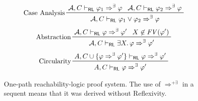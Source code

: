 \begin{figure}
    \begin{align*}
        & \prftree[l]{Case Analysis}
          { \mathcal{A}, C \vdash_\RL \varphi_1 \Rightarrow^{\exists} \varphi }
          { \mathcal{A}, C \vdash_\RL \varphi_2 \Rightarrow^{\exists} \varphi }
          { \mathcal{A}, C \vdash_\RL \varphi_1 \lor \varphi_2 \Rightarrow^{\exists} \varphi }
    \end{align*}
    \begin{align*}
        & \prftree[l]{Abstraction}
          { \mathcal{A}, C \vdash_\RL \varphi \Rightarrow^{\exists} \varphi^\prime }
          { X \not\in \mathit{FV}(\varphi^\prime) }
          { \mathcal{A}, C \vdash_\RL \exists X.\, \varphi \Rightarrow^{\exists} \varphi^\prime }
    \end{align*}
    \begin{align*}
        & \prftree[l]{Circularity}
          { A, C \cup \{ \varphi\Rightarrow^\exists \varphi^\prime \} \vdash_\RL \varphi \Rightarrow^\exists \varphi^\prime }
          { A, C \vdash_\RL \varphi \Rightarrow^\exists \varphi^\prime }
    \end{align*}

    \caption{One-path reachability-logic proof system.
    The use of $\Rightarrow^{+ \exists}$ in a sequent means that it was derived without Reflexivity.}
    \label{fig:RLproofsystem}
\end{figure}

